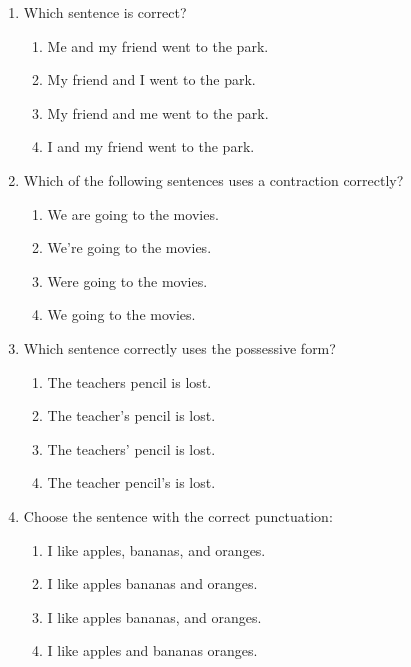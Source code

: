\documentclass[12pt]{article}
\begin{document}
\begin{enumerate}
    \item Which sentence is correct?

    \begin{enumerate}[label=\Alph*.]
        \item Me and my friend went to the park.
        \item My friend and I went to the park.
        \item My friend and me went to the park.
        \item I and my friend went to the park.
    \end{enumerate}

    \vspace{0.5cm}

    \item Which of the following sentences uses a contraction correctly?

    \begin{enumerate}[label=\Alph*.]
        \item We are going to the movies.
        \item We’re going to the movies.
        \item Were going to the movies.
        \item We going to the movies.
    \end{enumerate}

    \vspace{0.5cm}

    \item Which sentence correctly uses the possessive form?

    \begin{enumerate}[label=\Alph*.]
        \item The teachers pencil is lost.
        \item The teacher's pencil is lost.
        \item The teachers' pencil is lost.
        \item The teacher pencil's is lost.
    \end{enumerate}

    \vspace{0.5cm}

    \item Choose the sentence with the correct punctuation:

    \begin{enumerate}[label=\Alph*.]
        \item I like apples, bananas, and oranges.
        \item I like apples bananas and oranges.
        \item I like apples bananas, and oranges.
        \item I like apples and bananas oranges.
    \end{enumerate}


\end{enumerate}
\end{document}
